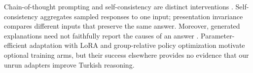 Chain-of-thought prompting and self-consistency are distinct interventions \citep{wei2022cot,
wang2023selfconsistency}. Self-consistency aggregates sampled responses to one input; presentation
invariance compares different inputs that preserve the same answer. Moreover, generated explanations need
not faithfully report the causes of an answer \citep{turpin2023unfaithful}. Parameter-efficient adaptation
with LoRA \citep{hu2021lora} and group-relative policy optimization \citep{shao2024deepseekmath} motivate
optional training arms, but their success elsewhere provides no evidence that our unrun adapters improve
Turkish reasoning.
